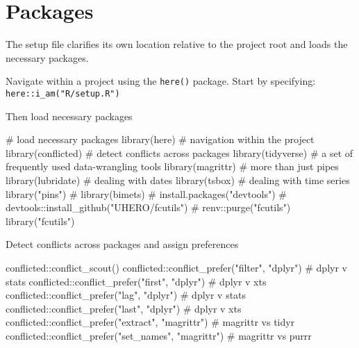 \documentclass[
  letterpaper,
  DIV=11,
  numbers=noendperiod]{scrreport}
\newenvironment{Shaded}{\begin{snugshade}}{\end{snugshade}}
\newcommand{\CommentTok}[1]{\textcolor[rgb]{0.37,0.37,0.37}{#1}}
\newcommand{\FunctionTok}[1]{\textcolor[rgb]{0.28,0.35,0.67}{#1}}
\newcommand{\NormalTok}[1]{\textcolor[rgb]{0.00,0.23,0.31}{#1}}
\newcommand{\SpecialCharTok}[1]{\textcolor[rgb]{0.37,0.37,0.37}{#1}}
\newcommand{\StringTok}[1]{\textcolor[rgb]{0.13,0.47,0.30}{#1}}
\begin{document}
\section{Packages}\label{packages}

The setup file clarifies its own location relative to the project root
and loads the necessary packages.

Navigate within a project using the \texttt{here()} package. Start by
specifying:\\
\texttt{here::i\_am("R/setup.R")}

Then load necessary packages

\begin{Shaded}
\begin{Highlighting}[]
\CommentTok{\# load necessary packages}
\FunctionTok{library}\NormalTok{(here) }\CommentTok{\# navigation within the project}
\FunctionTok{library}\NormalTok{(conflicted) }\CommentTok{\# detect conflicts across packages}
\FunctionTok{library}\NormalTok{(tidyverse) }\CommentTok{\# a set of frequently used data{-}wrangling tools}
\FunctionTok{library}\NormalTok{(magrittr) }\CommentTok{\# more than just pipes}
\FunctionTok{library}\NormalTok{(lubridate) }\CommentTok{\# dealing with dates}
\FunctionTok{library}\NormalTok{(tsbox) }\CommentTok{\# dealing with time series}
\FunctionTok{library}\NormalTok{(}\StringTok{"pins"}\NormalTok{)}
\CommentTok{\# library(bimets)}
\CommentTok{\# install.packages("devtools")}
\CommentTok{\# devtools::install\_github("UHERO/fcutils")}
\CommentTok{\# renv::purge("fcutils")}
\FunctionTok{library}\NormalTok{(}\StringTok{"fcutils"}\NormalTok{)}
\end{Highlighting}
\end{Shaded}

Detect conflicts across packages and assign preferences

\begin{Shaded}
\begin{Highlighting}[]
\NormalTok{conflicted}\SpecialCharTok{::}\FunctionTok{conflict\_scout}\NormalTok{()}
\NormalTok{conflicted}\SpecialCharTok{::}\FunctionTok{conflict\_prefer}\NormalTok{(}\StringTok{"filter"}\NormalTok{, }\StringTok{"dplyr"}\NormalTok{) }\CommentTok{\# dplyr v stats}
\NormalTok{conflicted}\SpecialCharTok{::}\FunctionTok{conflict\_prefer}\NormalTok{(}\StringTok{"first"}\NormalTok{, }\StringTok{"dplyr"}\NormalTok{) }\CommentTok{\# dplyr v xts}
\NormalTok{conflicted}\SpecialCharTok{::}\FunctionTok{conflict\_prefer}\NormalTok{(}\StringTok{"lag"}\NormalTok{, }\StringTok{"dplyr"}\NormalTok{) }\CommentTok{\# dplyr v stats}
\NormalTok{conflicted}\SpecialCharTok{::}\FunctionTok{conflict\_prefer}\NormalTok{(}\StringTok{"last"}\NormalTok{, }\StringTok{"dplyr"}\NormalTok{) }\CommentTok{\# dplyr v xts}
\NormalTok{conflicted}\SpecialCharTok{::}\FunctionTok{conflict\_prefer}\NormalTok{(}\StringTok{"extract"}\NormalTok{, }\StringTok{"magrittr"}\NormalTok{) }\CommentTok{\# magrittr vs tidyr}
\NormalTok{conflicted}\SpecialCharTok{::}\FunctionTok{conflict\_prefer}\NormalTok{(}\StringTok{"set\_names"}\NormalTok{, }\StringTok{"magrittr"}\NormalTok{) }\CommentTok{\# magrittr vs purrr}
\end{Highlighting}
\end{Shaded}
\end{document}
